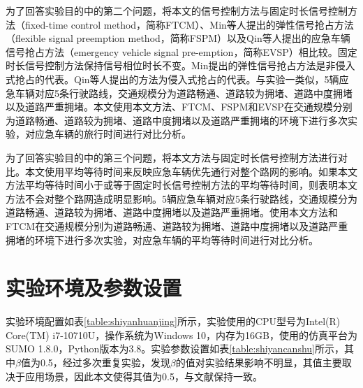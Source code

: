 为了回答实验目的中的第二个问题，将本文的信号控制方法与固定时长信号控制方法（fixed-time control method，简称FTCM）、Min等人\cite{min}提出的弹性信号抢占方法（flexible signal preemption  method，简称FSPM）以及Qin等人\cite{qin_control_2012}提出的应急车辆信号抢占方法（emergency vehicle signal pre-emption，简称EVSP）相比较。固定时长信号控制方法保持信号相位时长不变。Min提出的弹性信号抢占方法是非侵入式抢占的代表。Qin等人提出的方法为侵入式抢占的代表。与实验一类似，5辆应急车辆对应5条行驶路线，交通规模分为道路畅通、道路较为拥堵、道路中度拥堵以及道路严重拥堵。本文使用本文方法、FTCM、FSPM和EVSP在交通规模分别为道路畅通、道路较为拥堵、道路中度拥堵以及道路严重拥堵的环境下进行多次实验，对应急车辆的旅行时间进行对比分析。

为了回答实验目的中的第三个问题，将本文方法与固定时长信号控制方法进行对比。本文使用平均等待时间来反映应急车辆优先通行对整个路网的影响。如果本文方法平均等待时间小于或等于固定时长信号控制方法的平均等待时间，则表明本文方法不会对整个路网造成明显影响。5辆应急车辆对应5条行驶路线，交通规模分为道路畅通、道路较为拥堵、道路中度拥堵以及道路严重拥堵。使用本文方法和FTCM在交通规模分别为道路畅通、道路较为拥堵、道路中度拥堵以及道路严重拥堵的环境下进行多次实验，对应急车辆的平均等待时间进行对比分析。


\section{实验环境及参数设置}
实验环境配置如表\ref{table:shiyanhuanjing}所示，实验使用的CPU型号为Intel(R) Core(TM) i7-10710U，操作系统为Windows 10，内存为16GB，使用的仿真平台为SUMO 1.8.0，Python版本为3.8。实验参数设置如表\ref{table:shiyancanshu}所示，其中${\beta}$值为0.5，经过多次重复实验，发现${\beta}$的值对实验结果影响不明显，其值主要取决于应用场景，因此本文使得其值为0.5，与文献\cite{min}保持一致。




